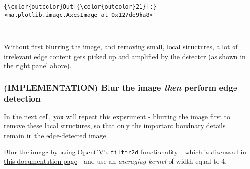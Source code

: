 \documentclass[11pt]{article}
\begin{document}
\begin{Verbatim}[commandchars=\\\{\}]
{\color{outcolor}Out[{\color{outcolor}21}]:} <matplotlib.image.AxesImage at 0x127de9ba8>
\end{Verbatim}
            
    \begin{center}
    \end{center}
    { \hspace*{\fill} \\}
    
    Without first blurring the image, and removing small, local structures,
a lot of irrelevant edge content gets picked up and amplified by the
detector (as shown in the right panel above).

    \hypertarget{implementation-blur-the-image-then-perform-edge-detection}{%
\subsubsection{\texorpdfstring{(IMPLEMENTATION) Blur the image
\emph{then} perform edge
detection}{(IMPLEMENTATION) Blur the image then perform edge detection}}\label{implementation-blur-the-image-then-perform-edge-detection}}

In the next cell, you will repeat this experiment - blurring the image
first to remove these local structures, so that only the important
boudnary details remain in the edge-detected image.

Blur the image by using OpenCV's \texttt{filter2d} functionality - which
is discussed in
\href{http://docs.opencv.org/3.1.0/d4/d13/tutorial_py_filtering.html}{this
documentation page} - and use an \emph{averaging kernel} of width equal
to 4.
\end{document}

